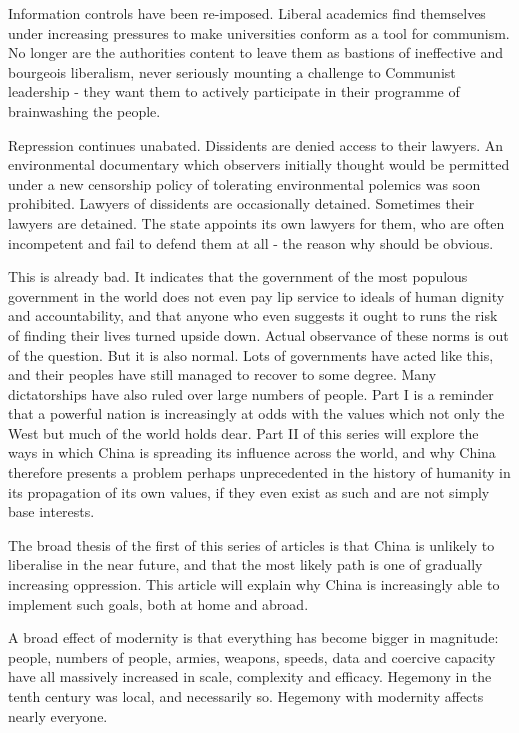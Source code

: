 	Information controls have been re-imposed. Liberal academics find themselves under increasing pressures to make universities conform as a tool for communism. No longer are the authorities content to leave them as bastions of ineffective and bourgeois liberalism, never seriously mounting a challenge to Communist leadership - they want them to actively participate in their programme of brainwashing the people.

	Repression continues unabated. Dissidents are denied access to their lawyers. An environmental documentary which observers initially thought would be permitted under a new censorship policy of tolerating environmental polemics was soon prohibited. Lawyers of dissidents are occasionally detained. Sometimes their lawyers are detained. The state appoints its own lawyers for them, who are often incompetent and fail to defend them at all - the reason why should be obvious.

	This is already bad. It indicates that the government of the most populous government in the world does not even pay lip service to ideals of human dignity and accountability, and that anyone who even suggests it ought to runs the risk of finding their lives turned upside down. Actual observance of these norms is out of the question. But it is also normal. Lots of governments have acted like this, and their peoples have still managed to recover to some degree. Many dictatorships have also ruled over large numbers of people. Part I is a reminder that a powerful nation is increasingly at odds with the values which not only the West but much of the world holds dear. Part II of this series will explore the ways in which China is spreading its influence across the world, and why China therefore presents a problem perhaps unprecedented in the history of humanity in its propagation of its own values, if they even exist as such and are not simply base interests.

	The broad thesis of the first of this series of articles is that China
	is unlikely to liberalise in the near future, and that the most likely
	path is one of gradually increasing oppression. This article will
	explain why China is increasingly able to implement such goals, both at
	home and abroad.

	A broad effect of modernity is that everything has become bigger in
	magnitude: people, numbers of people, armies, weapons, speeds, data and
	coercive capacity have all massively increased in scale, complexity and
	efficacy. Hegemony in the tenth century was local, and necessarily so.
	Hegemony with modernity affects nearly everyone.

